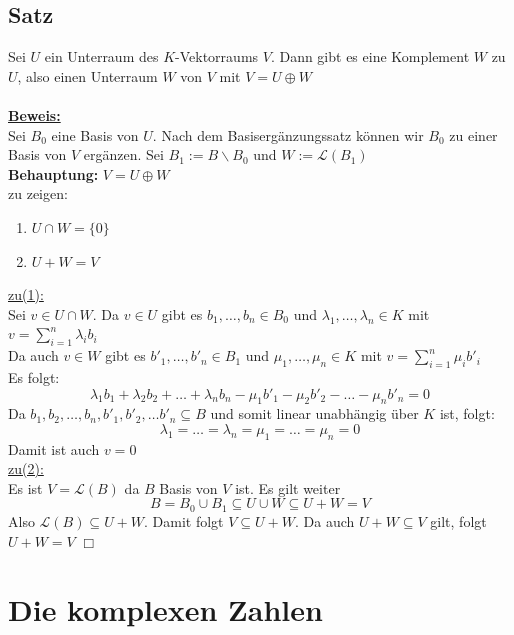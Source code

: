 \subsection{Satz} %
\label{sub:satz}
Sei $U$ ein Unterraum des \(K\)-Vektorraums $V$. Dann gibt es eine Komplement $W$ zu $U$, also einen Unterraum $W$ von $V$ mit 
$V=U \oplus W$ \\
\vspace{\baselineskip} \\
\underline{\textbf{Beweis:}} \\
Sei $B_0$ eine Basis von $U$. Nach dem Basisergänzungssatz können wir $B_0$ zu einer Basis von $V$ ergänzen. 
Sei $B_1 := B \backslash B_0$ und $W := \mathcal{L}(B_1)$ 
\vspace{\baselineskip} \\
\textbf{Behauptung:} $V= U \oplus W$ \\
zu zeigen:
\begin{enumerate}[(1)]
	\item $U \cap W = \{ 0\}$
	\item $U + W = V$
\end{enumerate}
\underline{zu(1):} \\
Sei $v \in U \cap W$. Da $v \in U$ gibt es $b_1 , \ldots , b_n \in B_0$ und $\lambda_1 , \ldots  , \lambda_n \in K$ mit 
$v= \sum\limits_{i=1}^{n} \lambda_i b_i$ \\
Da auch $v \in W$ gibt es $b'_1 , \ldots , b'_n \in B_1$ und $\mu_1 , \ldots ,\mu_n \in K$ mit 
$v = \sum\limits_{i=1}^n \mu_i b'_i$ \\
Es folgt:
\[
	\lambda_1 b_1 + \lambda_2 b_2 + \ldots + \lambda_n b_n - \mu_1 b'_1 - \mu_2 b'_2 - \ldots - \mu_n b'_n = 0
\]
Da $b_1, b_2, \ldots , b_n , b'_1, b'_2 , \ldots b'_n \subseteq B$ und somit linear unabhängig über $K$ ist, folgt:
\[
	\lambda_1 = \ldots = \lambda_n = \mu_1 = \ldots =\mu_n = 0
\]
Damit ist auch $v=0$ 
\vspace{\baselineskip} \\
\underline{zu(2):} \\
Es ist $V=\mathcal{L} (B)$ da $B$ Basis von $V$ ist. Es gilt weiter 
\[
	B=B_0 \cup B_1 \subseteq U \cup W \subseteq U +W =V
\]
Also $\mathcal{L}(B) \subseteq U +W$. Damit folgt $V \subseteq U +W$. Da auch $U + W \subseteq V$ gilt, folgt $U +W = V$ \quad $\Box$

\section{Die komplexen Zahlen} %
\label{sec:die_komplexen_zahlen}
